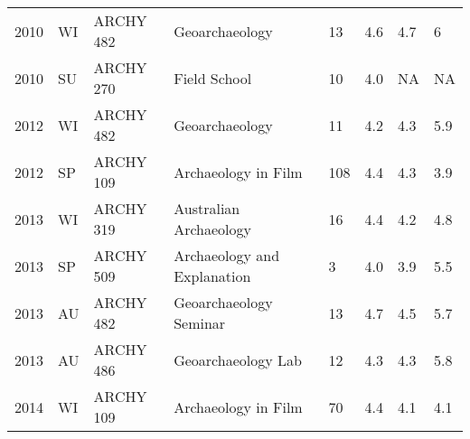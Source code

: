 \documentclass[11pt,article,oneside,oldfontcommands]{memoir}
\begin{document}
\begin{center}
\begin{minipage*}{15cm}
\begin{Spacing}{0.7}
\begin{tabular}{ p{0.5cm} p{0.5cm} L{1.5cm} L{4cm} R{1.5cm}  R{1cm}  R{1cm}  R{1cm}  }
    2010  & WI   & ARCHY 482   & Geoarchaeology                                                         & 13              & 4.6          & 4.7                   & 6                                                                 \\
    2010  & SU   & ARCHY 270   & Field School                                                           & 10              & 4.0            & NA                    & NA                                                                \\
    2012  & WI   & ARCHY 482   & Geoarchaeology                                                         & 11              & 4.2          & 4.3                   & 5.9                                                               \\
    2012  & SP   & ARCHY 109   & Archaeology in Film                                                    & 108             & 4.4          & 4.3                   & 3.9                                                               \\
    2013  & WI   & ARCHY 319   & Australian Archaeology                                                 & 16              & 4.4          & 4.2                   & 4.8                                                               \\
    2013  & SP   & ARCHY 509   & Archaeology and Explanation                                            & 3               & 4.0            & 3.9                   & 5.5                                                               \\
    2013  & AU   & ARCHY 482   & Geoarchaeology Seminar                                                 & 13              & 4.7          & 4.5                   & 5.7                                                               \\
    2013  & AU   & ARCHY 486   & Geoarchaeology Lab                                                     & 12              & 4.3          & 4.3                   & 5.8                                                               \\
    2014  & WI   & ARCHY 109   & Archaeology in Film                                                    & 70              & 4.4          & 4.1                   & 4.1                                                               \\
      \bottomrule
    \end{tabular}

\end{Spacing}
\end{minipage*}

\end{center}
\end{document}
